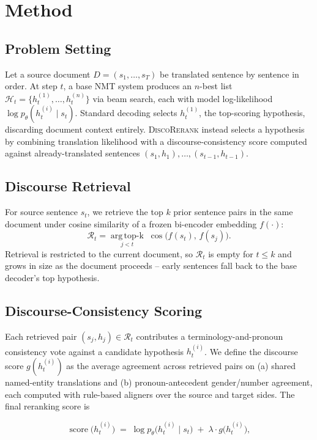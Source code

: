 \section{Method}

\subsection{Problem Setting}
Let a source document $D = (s_1, \dots, s_T)$ be translated sentence by
sentence in order. At step $t$, a base NMT system produces an $n$-best list
$\mathcal{H}_t = \{h_t^{(1)}, \dots, h_t^{(n)}\}$ via beam search, each with
model log-likelihood $\log p_\theta(h_t^{(i)} \mid s_t)$. Standard decoding
selects $h_t^{(1)}$, the top-scoring hypothesis, discarding document context
entirely. \textsc{DiscoRerank} instead selects a hypothesis by combining
translation likelihood with a discourse-consistency score computed against
already-translated sentences $(s_1, h_1), \dots, (s_{t-1}, h_{t-1})$.

\subsection{Discourse Retrieval}
For source sentence $s_t$, we retrieve the top $k$ prior sentence pairs in
the same document under cosine similarity of a frozen bi-encoder embedding
$f(\cdot)$:
\[
  \mathcal{R}_t = \operatorname*{arg\,top\text{-}k}_{j < t}\; \cos\!\big(f(s_t),\, f(s_j)\big).
\]
Retrieval is restricted to the current document, so $\mathcal{R}_t$ is empty
for $t \le k$ and grows in size as the document proceeds -- early sentences
fall back to the base decoder's top hypothesis.

\subsection{Discourse-Consistency Scoring}
Each retrieved pair $(s_j, h_j) \in \mathcal{R}_t$ contributes a
terminology-and-pronoun consistency vote against a candidate hypothesis
$h_t^{(i)}$. We define the discourse score $g(h_t^{(i)})$ as the average
agreement across retrieved pairs on (a) shared named-entity translations and
(b) pronoun-antecedent gender/number agreement, each computed with
rule-based aligners over the source and target sides. The final reranking
score is

\begin{equation}
\label{eq:rerank}
  \operatorname{score}\big(h_t^{(i)}\big) \;=\; \log p_\theta\big(h_t^{(i)} \mid s_t\big) \;+\; \lambda \cdot g\big(h_t^{(i)}\big),
\end{equation}

